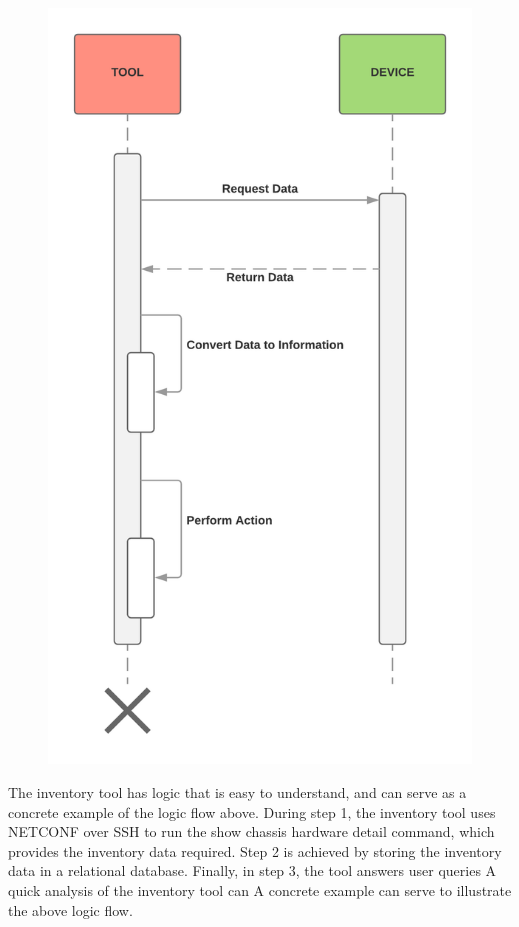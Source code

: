 \begin{figure}[h]
\begin{minipage}{0.5\textwidth}
	\includegraphics[width=\textwidth]{gfx/general_tool_logic_flow}
\end{minipage}
\end{figure}

The inventory tool has logic that is easy to understand, and can serve as a 
concrete example of the logic flow above. During step 1, the inventory tool
uses NETCONF over SSH to run the show chassis hardware detail command, which
provides the inventory data required. Step 2 is achieved by storing the inventory
data in a relational database. Finally, in step 3, the tool answers user queries 
A quick analysis of the inventory tool can 
A concrete example can serve to illustrate the above logic flow.
